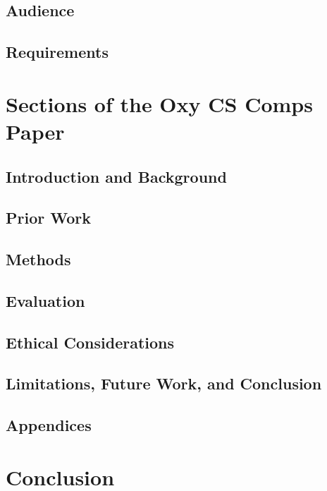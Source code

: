 \documentclass[10pt,twocolumn]{article}
\begin{document}
\subsection{Audience}

\subsection{Requirements}

\section{Sections of the Oxy CS Comps Paper}

\subsection{Introduction and Background}

\subsection{Prior Work}

\subsection{Methods}

\subsection{Evaluation}

\subsection{Ethical Considerations}

\subsection{Limitations, Future Work, and Conclusion}

\subsection{Appendices}

\section{Conclusion}

\printbibliography 
\end{document}
